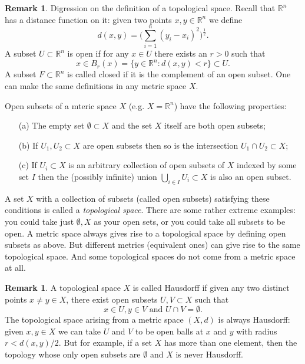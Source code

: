 \documentclass [12pt,oneside,a4paper,mathscr]{amsart}
\theoremstyle{definition}
\newtheorem{remark}[thm]{Remark}
\newcommand{\R}{\mathbb{R}}
\begin{document}
\begin{remark}
Digression on the definition of a topological space. Recall that $\R^n$ has a distance function on it: given two points $x,y\in \R^n$ we define
\[d(x,y)=\bigg(\sum_{i=1}^n (y_i-x_i)^2\bigg)^{\frac{1}{2}}.\]
A subset $U\subset \R^n$ is open if for any $x\in U$ there exists an $r>0$ such that
\[x\in B_r(x)=\{y\in \R^n : d(x,y)<r\} \subset U.\]
A subset $F\subset \R^n$ is called closed if it is the complement of an open subset.
One can make the same definitions in any metric space $X$.

Open subsets of a mteric space $X$ (e.g. $X=\R^n$) have the following properties:\smallskip
\begin{itemize}
\item[(a)] The empty set $\emptyset\subset X$ and the set $X$ itself are both open subsets;\smallskip
\item[(b)] If $U_1,U_2\subset X$ are open subsets then so is the intersection $U_1\cap U_2\subset X$;\smallskip
\item[(c)]  If $U_i\subset X$ is an arbitrary collection of open subsets of $X$ indexed by some set $I$ then the (possibly infinite) union
$\bigcup_{i\in I} U_i\subset X$
is also an open subset.
\end{itemize}

A set $X$ with a collection of subsets (called open subsets) satisfying these conditions is called a \emph{topological space}. There are some rather extreme examples: you could take just $\emptyset,X$ as your open sets, or you could take all subsets to be open. A metric space always gives rise to a topological space by defining open subsets as above.
But different metrics (equivalent ones) can give rise to the same topological space. And some topological spaces do not come from a metric space at all.

\end{remark}

\begin{remark}A topological space $X$ is called Hausdorff if given any two distinct points $x\neq y\in X$, there exist open subsets $U,V\subset X$ such that
\[ x\in U, y\in V\text{ and }U\cap V=\emptyset.\]
The topological space arising from a metric space $(X,d)$ is always Hausdorff: given $x,y\in X$ we can take $U$ and $V$ to be open balls at $x$ and $y$ with radius $r<d(x,y)/2$. But for example, if a set $X$ has more than one element, then the topology whose only open subsets are $\emptyset$ and $X$ is never Hausdorff. 
\end{remark}
\end{document}

